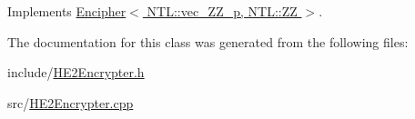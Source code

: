 Implements \hyperlink{classEncipher_a27d3efa1e364c1f0d7def65454c61b85}{Encipher$<$ N\+T\+L\+::vec\+\_\+\+Z\+Z\+\_\+p, N\+T\+L\+::\+Z\+Z $>$}.



The documentation for this class was generated from the following files\+:\begin{DoxyCompactItemize}
\item 
include/\hyperlink{HE2Encrypter_8h}{H\+E2\+Encrypter.\+h}\item 
src/\hyperlink{HE2Encrypter_8cpp}{H\+E2\+Encrypter.\+cpp}\end{DoxyCompactItemize}
